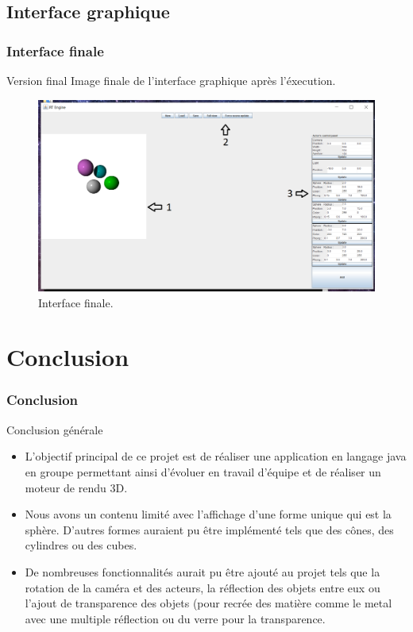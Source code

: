 \documentclass{beamer}
\begin{document}
	\subsection{Interface graphique}
		\begin{frame}
		\frametitle{Interface finale}
			\begin{block}{Version final}
					Image finale de l'interface graphique après l'éxecution.
			\begin{figure}[h]
                    \begin{center}
                    \includegraphics[width=1\textwidth]{./images/Capture.png}
                    \end{center}
                    \caption{Interface finale.}
                    \label{fig}
            \end{figure}
			\end{block}	
		\end{frame}
\section{Conclusion}
	\begin{frame}
		\frametitle{Conclusion}
			\begin{block}{Conclusion générale}
				\begin{itemize}
					\item L'objectif principal de ce projet est de réaliser une application en langage java en groupe permettant ainsi d'évoluer en travail d'équipe et de réaliser un moteur de rendu 3D.
					\item Nous avons un contenu limité avec l'affichage d'une forme unique qui est la sphère. D'autres formes auraient pu être implémenté tels que des cônes, des cylindres ou des cubes.
					\item De nombreuses fonctionnalités aurait pu être ajouté au projet tels que la rotation de la caméra et des acteurs, la réflection des objets entre eux ou l'ajout de transparence des objets (pour recrée des matière comme le metal avec une multiple réflection ou du verre pour la transparence.
				\end{itemize}
			\end{block}
		\end{frame}
\end{document}
